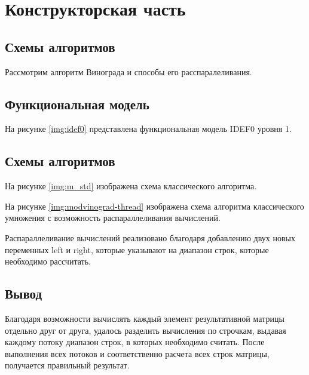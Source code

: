 \chapter{Конструкторская часть}

\section{Схемы алгоритмов}


Рассмотрим алгоритм Винограда и способы его расспаралеливания.

\section{Функциональная модель}

На рисунке \ref{img:idef0} представлена функциональная модель IDEF0 уровня 1.


\section{Схемы алгоритмов}

На рисунке \ref{img:m_std} изображена схема классического
алгоритма.


\newpage

На рисунке \ref{img:modvinograd-thread} изображена схема
алгоритма классического умножения с возможность распараллеливания вычислений.

\newpage


Распараллеливание вычислений реализовано благодаря добавлению двух новых переменных {\ttfamily left} и {\ttfamily right}, которые указывают на диапазон строк, которые необходимо рассчитать.

\newpage
\section*{Вывод}

Благодаря возможности вычислять каждый элемент результативной матрицы отдельно друг от друга, удалось разделить вычисления по строчкам, выдавая каждому потоку диапазон строк, в которых необходимо считать. После выполнения всех потоков и соответственно расчета всех строк матрицы, получается правильный результат.
